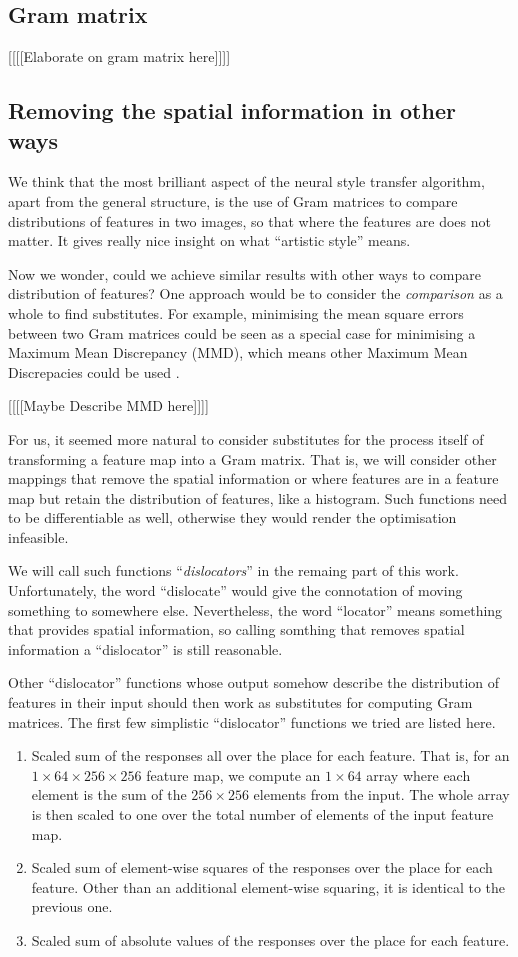 \documentclass[runningheads]{llncs}
\begin{document}
\subsection{Gram matrix}
[[[[Elaborate on gram matrix here]]]]

\subsection{Removing the spatial information in other ways}
We think that the most brilliant aspect of the neural style transfer algorithm,
apart from the general structure, is the use of Gram matrices to compare 
distributions of features in two images, so that where the features are does not matter.
It gives really nice insight on what ``artistic style'' means.

Now we wonder, could we achieve similar results with other ways to compare 
distribution of features?
One approach would be to consider the \emph{comparison} as a whole to find 
substitutes. 
For example, minimising the mean square errors between two Gram matrices could be seen as 
a special case for minimising a Maximum Mean Discrepancy (MMD), which means other Maximum Mean Discrepacies
could be used \cite{MMD}.

[[[[Maybe Describe MMD here]]]]

For us, it seemed more natural to consider substitutes for the process itself of 
transforming a feature map into a Gram matrix. 
That is, we will consider other
mappings that remove the spatial information or where features are in a feature map but retain
the distribution of features, like a histogram.
Such functions need to be differentiable as well, otherwise they would render the 
optimisation infeasible.

We will call such functions ``\emph{dislocators}'' in the remaing part of this work.
Unfortunately, the word ``dislocate'' would give the connotation of moving something to somewhere else.
Nevertheless, the word ``locator'' means something that provides spatial information,
so calling somthing that removes spatial information a ``dislocator'' is still reasonable.

Other ``dislocator'' functions whose output somehow describe the 
distribution of features in their input should then work as substitutes
for computing Gram matrices.
The first few simplistic ``dislocator'' functions we tried are listed here.
\begin{enumerate}
\item Scaled sum of the responses all over the place for each feature.
That is, for an $1\times64\times256\times256$ feature map,
we compute an $1\times64$ array where each element is the sum of the
$256\times256$ elements from the input.
The whole array is then scaled to one over the total number of elements of the input feature map.
\item Scaled sum of element-wise squares of the responses over the place for each feature.
Other than an additional element-wise squaring, it is identical to the previous one.
\item Scaled sum of absolute values of the responses over the place for each feature.
\end{enumerate}
\end{document}
